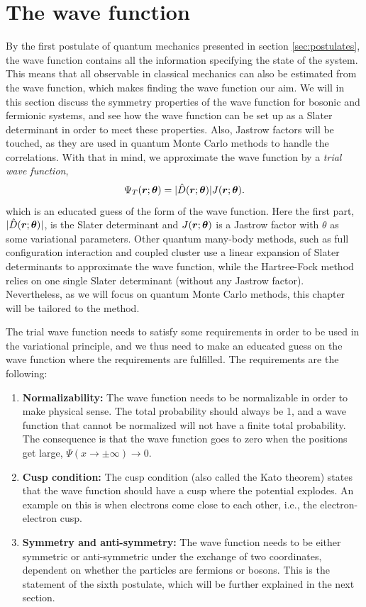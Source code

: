 \section{The wave function} \label{sec:wavefunction}
By the first postulate of quantum mechanics presented in section \ref{sec:postulates}, the wave function contains all the information specifying the state of the system. This means that all observable in classical mechanics can also be estimated from the wave function, which makes finding the wave function our aim. We will in this section discuss the symmetry properties of the wave function for bosonic and fermionic systems, and see how the wave function can be set up as a Slater determinant in order to meet these properties. Also, Jastrow factors will be touched, as they are used in quantum Monte Carlo methods to handle the correlations. With that in mind, we approximate the wave function by a \textit{trial wave function},
\begin{equation}
\Psi_T(\boldsymbol{{r}};\boldsymbol{{\theta}})=|\hat{D}(\boldsymbol{{r}};\boldsymbol{{\theta}})|J(\boldsymbol{{r}};\boldsymbol{{\theta}}).
\end{equation}
which is an educated guess of the form of the wave function. 
Here the first part, $|\hat{D}(\boldsymbol{{r}};\boldsymbol{{\theta}})|$, is the Slater determinant and $J(\boldsymbol{{r}};\boldsymbol{{\theta}})$ is a Jastrow factor with $\theta$ as some variational parameters. Other quantum many-body methods, such as full configuration interaction and coupled cluster use a linear expansion of Slater determinants to approximate the wave function, while the Hartree-Fock method relies on one single Slater determinant (without any Jastrow factor). Nevertheless, as we will focus on quantum Monte Carlo methods, this chapter will be tailored to the method. 

The trial wave function needs to satisfy some requirements in order to be used in the variational principle, and we thus need to make an educated guess on the wave function where the requirements are fulfilled. The requirements are the following:

\begin{enumerate}
	\item \textbf{Normalizability:} The wave function needs to be normalizable in order to make physical sense. The total probability should always be 1, and a wave function that cannot be normalized will not have a finite total probability. The consequence is that the wave function goes to zero when the positions get large, $\Psi(x\rightarrow\pm\infty)\rightarrow 0$. 
	
	\item \textbf{Cusp condition:} The cusp condition (also called the Kato theorem) states that the wave function should have a cusp where the potential explodes. An example on this is when electrons come close to each other, i.e., the electron-electron cusp.
	
	\item \textbf{Symmetry and anti-symmetry:} The wave function needs to be either symmetric or anti-symmetric under the exchange of two coordinates, dependent on whether the particles are fermions or bosons. This is the statement of the sixth postulate, which will be further explained in the next section.
\end{enumerate}

